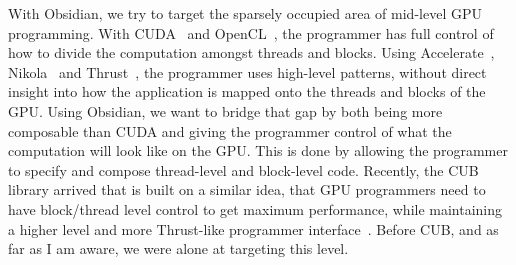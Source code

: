 \documentclass[a4paper]{book}
\begin{document}
With Obsidian, we try to target the sparsely occupied area of mid-level GPU programming. With 
CUDA~\citet{wwwcuda} and OpenCL~\citet{OpenCL}, the programmer has full control of how to divide 
the computation amongst threads and blocks. Using Accelerate~\citet{ACCELERATEDAMP11}, 
Nikola~\citet{NIKOLA} 
and Thrust~\citet{THRUST}, the programmer uses 
high-level patterns, without direct insight into how the application is mapped onto 
the threads and blocks of the GPU. Using Obsidian, we want to bridge that gap by both being 
more composable than CUDA and giving the programmer control of what the computation will 
look like on the GPU. This is done by allowing the programmer to specify and compose 
thread-level and block-level code. Recently, the CUB library arrived that is built on a 
similar idea, that GPU programmers need to have block/thread level control to get maximum 
performance, while maintaining a higher level and more Thrust-like programmer 
interface~\citet{CUB}. Before CUB, and as far as I am aware, we were alone at targeting 
this level.  
\end{document}
